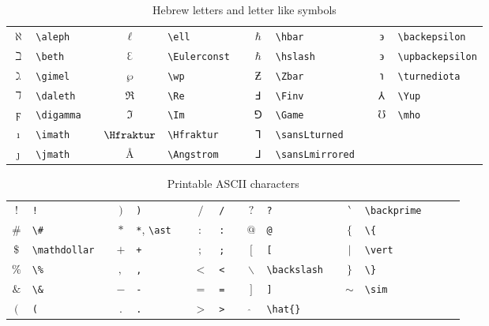 \documentclass[captions=tableheading]{scrartcl}
\begin{document}
\begin{table}
  \caption{Hebrew letters and letter like symbols}
  \label{tab:hebrew-and-letterlike}
  \centering
  \begin{tabular}[c]{clp{1pt}clp{1pt}clp{1pt}cl}
    \toprule
    $\aleph$ & \verb|\aleph| & &
    $\ell$ & \verb|\ell| & &
    $\hbar$ & \verb|\hbar| & &
    $\backepsilon$ & \verb|\backepsilon| \\
    $\beth$ & \verb|\beth| & &
    $\Eulerconst$ & \verb|\Eulerconst| & &
    $\hslash$ & \verb|\hslash| & &
    $\upbackepsilon$ & \verb|\upbackepsilon| \\
    $\gimel$ & \verb|\gimel| & &
    $\wp$ & \verb|\wp| & &
    $\Zbar$ & \verb|\Zbar| & &
    $\turnediota$ & \verb|\turnediota| \\
    $\daleth$ & \verb|\daleth| & &
    $\Re$ & \verb|\Re| & &
    $\Finv$ & \verb|\Finv| & &
    $\Yup$ & \verb|\Yup| \\
    $\digamma$ & \verb|\digamma| & &
    $\Im$ & \verb|\Im| & &
    $\Game$ & \verb|\Game| & &
    $\mho$ & \verb|\mho| \\
    $\imath$ & \verb|\imath| & &
    $\Hfraktur$ & \verb|\Hfraktur| & &
    $\sansLturned$ & \verb|\sansLturned| & &
    & \\
    $\jmath$ & \verb|\jmath| & &
    $\Angstrom$ & \verb|\Angstrom| & &
    $\sansLmirrored$ & \verb|\sansLmirrored| & &
    & \\
    \bottomrule
  \end{tabular}
\end{table}

\begin{table}
  \caption{Printable \textsc{ASCII} characters}
  \label{tab:ascii}
  \centering
  \begin{tabular}[c]{clp{1pt}clp{1pt}clp{1pt}clp{1pt}clp{1pt}cl}
    \toprule
    $!$ & \verb|!| & & $)$ & \verb|)| & & $/$ & \verb|/| & &
    $?$ & \verb|?| & & $\backprime$ & \verb|\backprime| \\
    $\#$ & \verb|\#| & & $*$ & \verb|*|, \verb|\ast| & &
    $:$ & \verb|:| & & $@$ & \verb|@| & & $\{$ & \verb|\{| \\
    $\mathdollar$ & \verb|\mathdollar| & & $+$ & \verb|+| & &
    $;$ & \verb|;| & & $[$ & \verb|[| & & $\vert$ & \verb|\vert| \\
    $\%$ & \verb|\%| & & $,$ & \verb|,| & & $<$ & \verb|<| & &
    $\backslash$ & \verb|\backslash| & & $\}$ & \verb|\}| \\
    $\&$ & \verb|\&| & & $-$ & \verb|-| & & $=$ & \verb|=| & &
    $]$ & \verb|]| & & $\sim$ & \verb|\sim| \\
    $($ & \verb|(| & & $.$ & \verb|.| & & $>$ & \verb|>| & &
    $\hat{}$ & \verb|\hat{}| & & & \\
    \bottomrule
  \end{tabular}
\end{table}
\end{document}
